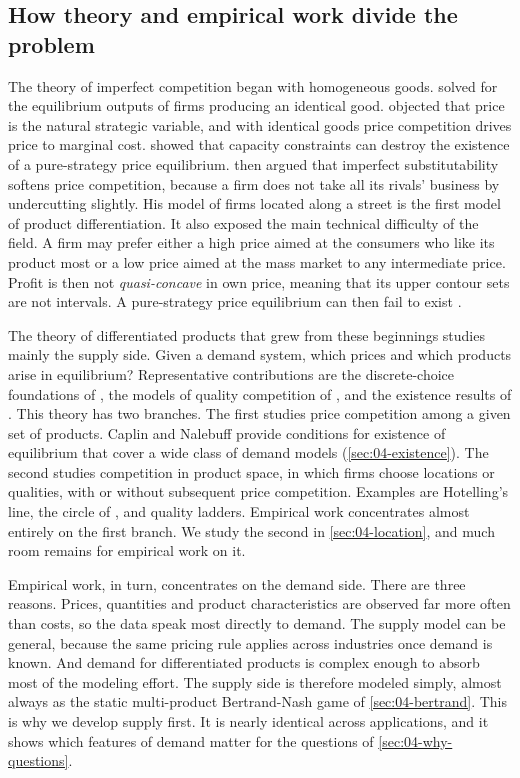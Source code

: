 \subsection{How theory and empirical work divide the problem}\label{sec:04-why-division}

The theory of imperfect competition began with homogeneous goods. \citet{Cournot1838} solved for the equilibrium
outputs of firms producing an identical good. \citet{Bertrand1883} objected that price is the natural strategic
variable, and with identical goods price competition drives price to marginal cost. \citet{Edgeworth1897} showed
that capacity constraints can destroy the existence of a pure-strategy price equilibrium.
\citet{Hotelling1929} then argued that imperfect substitutability softens price competition, because a firm does
not take all its rivals' business by undercutting slightly. His model of firms located along a street is the
first model of product differentiation. It also exposed the main technical difficulty of the field. A firm may
prefer either a high price aimed at the consumers who like its product most or a low price aimed at the mass
market to any intermediate price. Profit is then not \emph{quasi-concave} in own price, meaning that its upper
contour sets are not intervals. A pure-strategy price equilibrium can then fail to exist
\citep[pp.~1--3 of the discussion-paper version]{CaplinNalebuff1991}.

The theory of differentiated products that grew from these beginnings studies mainly the supply side. Given a
demand system, which prices and which products arise in equilibrium? Representative contributions are the
discrete-choice foundations of \citet{AndersonDePalmaThisse1992}, the models of quality competition of
\citet{ShakedSutton1982,ShakedSutton1983}, and the existence results of \citet{CaplinNalebuff1991}. This theory has
two branches. The first studies price competition among a given set of products. Caplin and Nalebuff provide
conditions for existence of equilibrium that cover a wide class of demand models (\cref{sec:04-existence}). The
second studies competition in product space, in which firms choose locations or qualities, with or without
subsequent price competition. Examples are Hotelling's line, the circle of \citet{Salop1979}, and quality
ladders. Empirical work concentrates almost entirely on the first branch. We study the second in
\cref{sec:04-location}, and much room remains for empirical work on it.

Empirical work, in turn, concentrates on the demand side. There are three reasons. Prices, quantities and product
characteristics are observed far more often than costs, so the data speak most directly to demand. The supply
model can be general, because the same pricing rule applies across industries once demand is known. And demand
for differentiated products is complex enough to absorb most of the modeling effort. The supply side is therefore
modeled simply, almost always as the static multi-product Bertrand-Nash game of \cref{sec:04-bertrand}. This is
why we develop supply first. It is nearly identical across applications, and it shows which features of demand
matter for the questions of \cref{sec:04-why-questions}.


